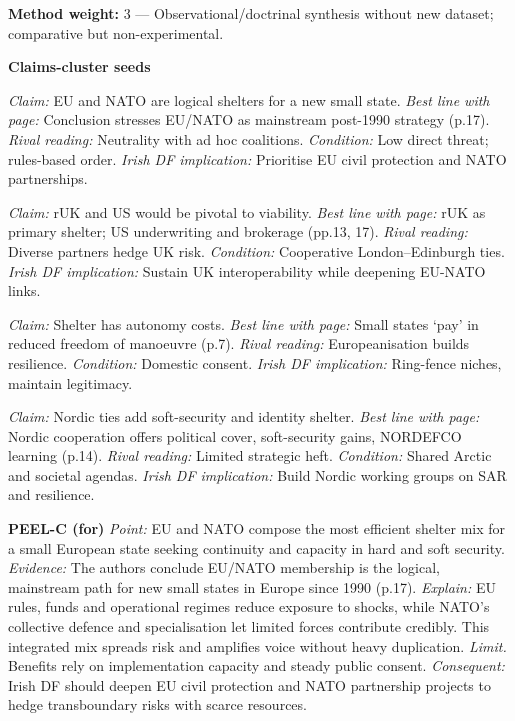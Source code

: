 \textbf{Method weight:} 3 — Observational/doctrinal synthesis without new dataset; comparative but non-experimental.

\textbf{Claims-cluster seeds}

\textit{Claim:} EU and NATO are logical shelters for a new small state. \textit{Best line with page:} Conclusion stresses EU/NATO as mainstream post-1990 strategy (p.17). \textit{Rival reading:} Neutrality with ad hoc coalitions. \textit{Condition:} Low direct threat; rules-based order. \textit{Irish DF implication:} Prioritise EU civil protection and NATO partnerships.

\textit{Claim:} rUK and US would be pivotal to viability. \textit{Best line with page:} rUK as primary shelter; US underwriting and brokerage (pp.13, 17). \textit{Rival reading:} Diverse partners hedge UK risk. \textit{Condition:} Cooperative London–Edinburgh ties. \textit{Irish DF implication:} Sustain UK interoperability while deepening EU-NATO links.

\textit{Claim:} Shelter has autonomy costs. \textit{Best line with page:} Small states ‘pay’ in reduced freedom of manoeuvre (p.7). \textit{Rival reading:} Europeanisation builds resilience. \textit{Condition:} Domestic consent. \textit{Irish DF implication:} Ring-fence niches, maintain legitimacy.

\textit{Claim:} Nordic ties add soft-security and identity shelter. \textit{Best line with page:} Nordic cooperation offers political cover, soft-security gains, NORDEFCO learning (p.14). \textit{Rival reading:} Limited strategic heft. \textit{Condition:} Shared Arctic and societal agendas. \textit{Irish DF implication:} Build Nordic working groups on SAR and resilience.

\textbf{PEEL-C (for)}
\textit{Point:} EU and NATO compose the most efficient shelter mix for a small European state seeking continuity and capacity in hard and soft security.
\textit{Evidence:} The authors conclude EU/NATO membership is the logical, mainstream path for new small states in Europe since 1990 (p.17).
\textit{Explain:} EU rules, funds and operational regimes reduce exposure to shocks, while NATO’s collective defence and specialisation let limited forces contribute credibly. This integrated mix spreads risk and amplifies voice without heavy duplication.
\textit{Limit.} Benefits rely on implementation capacity and steady public consent.
\textit{Consequent:} Irish DF should deepen EU civil protection and NATO partnership projects to hedge transboundary risks with scarce resources.


